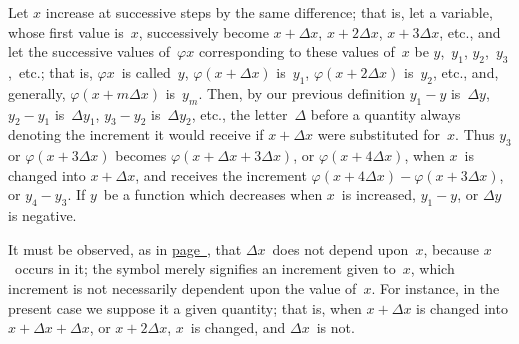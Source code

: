 \documentclass[12pt]{book}[2005/09/16]
\newcommand{\PageRef}[2][page]{\hyperref[page:#2]{#1~\pageref*{page:#2}}}
\renewcommand{\(}{{\upshape(}}
\renewcommand{\)}{{\upshape)}}
\renewcommand{\phi}{\varphi}
\begin{document}
Let $x$ increase at successive steps by the same difference;
that is, let a variable, whose first value is~$x$,
successively become $x + \Delta x$, $x + 2\Delta x$, $x + 3\Delta x$, etc.,
and let the successive values of~$\phi x$ corresponding to
these values of~$x$ be $y$,~$y_{1}$, $y_{2}$,~$y_{3}$,~etc.; that is, $\phi x$~is
called~$y$, $\phi(x + \Delta x)$ is~$y_{1}$, $\phi(x + 2\Delta x)$ is~$y_{2}$, etc., and,
generally, $\phi(x + m\Delta x)$ is~$y_{m}$. Then, by our previous
definition $y_{1} - y$ is~$\Delta y$, $y_{2} - y_{1}$ is~$\Delta y_{1}$, $y_{3} - y_{2}$ is~$\Delta y_{2}$,
etc., the letter~$\Delta$ before a quantity always denoting
the increment it would receive if $x + \Delta x$ were substituted
for~$x$. Thus $y_{3}$ or $\phi(x + 3\Delta x)$ becomes $\phi(x + \Delta x + 3\Delta x)$,
or $\phi(x + 4\Delta x)$, when $x$~is changed into
$x + \Delta x$, and receives the increment $\phi(x + 4\Delta x) - \phi(x + 3\Delta x)$, or $y_{4} - y_{3}$. If $y$~be a function which decreases
when $x$~is increased, $y_{1} - y$, or $\Delta y$ is negative.

It must be observed, as in \PageRef{26}, that $\Delta x$~does
not depend upon~$x$, because $x$~occurs in it; the symbol
merely signifies an increment given to~$x$, which
increment is not necessarily dependent upon the value
of~$x$. For instance, in the present case we suppose
it a given quantity; that is, when $x + \Delta x$ is changed
into $x + \Delta x + \Delta x$, or $x + 2\Delta x$, $x$~is changed, and $\Delta x$~is
not.
\end{document}
